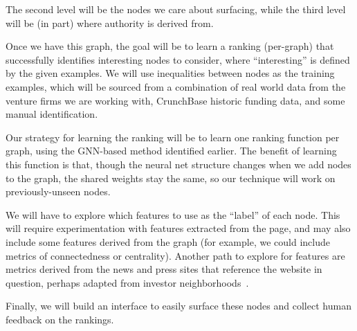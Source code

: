 The second level will be the nodes we care about surfacing, while the third level will be (in part) where authority is derived from.

Once we have this graph, the goal will be to learn a ranking (per-graph) that successfully identifies interesting nodes to consider, where ``interesting'' is defined by the given examples. We will use inequalities between nodes as the training examples, which will be sourced from a combination of real world data from the venture firms we are working with, CrunchBase historic funding data, and some manual identification.

Our strategy for learning the ranking will be to learn one ranking function per graph, using the GNN-based method identified earlier. The benefit of learning this function is that, though the neural net structure changes when we add nodes to the graph, the shared weights stay the same, so our technique will work on previously-unseen nodes.

We will have to explore which features to use as the ``label'' of each node. This will require experimentation with features extracted from the page, and may also include some features derived from the graph (for example, we could include metrics of connectedness or centrality). Another path to explore for features are metrics derived from the news and press sites that reference the website in question, perhaps adapted from investor neighborhoods~\cite{2017arXiv170604229H}.

Finally, we will build an interface to easily surface these nodes and collect human feedback on the rankings.



